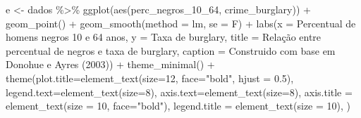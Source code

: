 \documentclass[
]{article}
\newenvironment{Shaded}{\begin{snugshade}}{\end{snugshade}}
\newcommand{\AttributeTok}[1]{\textcolor[rgb]{0.77,0.63,0.00}{#1}}
\newcommand{\DecValTok}[1]{\textcolor[rgb]{0.00,0.00,0.81}{#1}}
\newcommand{\FloatTok}[1]{\textcolor[rgb]{0.00,0.00,0.81}{#1}}
\newcommand{\FunctionTok}[1]{\textcolor[rgb]{0.00,0.00,0.00}{#1}}
\newcommand{\NormalTok}[1]{#1}
\newcommand{\OtherTok}[1]{\textcolor[rgb]{0.56,0.35,0.01}{#1}}
\newcommand{\SpecialCharTok}[1]{\textcolor[rgb]{0.00,0.00,0.00}{#1}}
\newcommand{\StringTok}[1]{\textcolor[rgb]{0.31,0.60,0.02}{#1}}
\begin{document}
\begin{Shaded}
\begin{Highlighting}[]
\NormalTok{e }\OtherTok{\textless{}{-}}\NormalTok{ dados }\SpecialCharTok{\%\textgreater{}\%} 
  \FunctionTok{ggplot}\NormalTok{(}\FunctionTok{aes}\NormalTok{(perc\_negros\_10\_64, crime\_burglary)) }\SpecialCharTok{+}
  \FunctionTok{geom\_point}\NormalTok{() }\SpecialCharTok{+} 
  \FunctionTok{geom\_smooth}\NormalTok{(}\AttributeTok{method =} \StringTok{\textquotesingle{}lm\textquotesingle{}}\NormalTok{, }\AttributeTok{se =}\NormalTok{ F) }\SpecialCharTok{+}
  \FunctionTok{labs}\NormalTok{(}\AttributeTok{x =} \StringTok{\textquotesingle{}Percentual de homens negros 10 e 64 anos\textquotesingle{}}\NormalTok{,}
       \AttributeTok{y =} \StringTok{\textquotesingle{}Taxa de burglary\textquotesingle{}}\NormalTok{,}
       \AttributeTok{title =} \StringTok{\textquotesingle{}Relação entre percentual de negros e taxa de burglary\textquotesingle{}}\NormalTok{,}
       \AttributeTok{caption =} \StringTok{\textquotesingle{}Construido com base em Donohue e Ayres (2003)\textquotesingle{}}\NormalTok{) }\SpecialCharTok{+} 
  \FunctionTok{theme\_minimal}\NormalTok{() }\SpecialCharTok{+}
  \FunctionTok{theme}\NormalTok{(}\AttributeTok{plot.title=}\FunctionTok{element\_text}\NormalTok{(}\AttributeTok{size=}\DecValTok{12}\NormalTok{, }\AttributeTok{face=}\StringTok{"bold"}\NormalTok{, }\AttributeTok{hjust =} \FloatTok{0.5}\NormalTok{),}
        \AttributeTok{legend.text=}\FunctionTok{element\_text}\NormalTok{(}\AttributeTok{size=}\DecValTok{8}\NormalTok{),}
        \AttributeTok{axis.text=}\FunctionTok{element\_text}\NormalTok{(}\AttributeTok{size=}\DecValTok{8}\NormalTok{),}
        \AttributeTok{axis.title =} \FunctionTok{element\_text}\NormalTok{(}\AttributeTok{size =} \DecValTok{10}\NormalTok{, }\AttributeTok{face=}\StringTok{"bold"}\NormalTok{),}
        \AttributeTok{legend.title =} \FunctionTok{element\_text}\NormalTok{(}\AttributeTok{size =} \DecValTok{10}\NormalTok{),}
\NormalTok{        )}
  

\end{Highlighting}
\end{Shaded}
\end{document}
